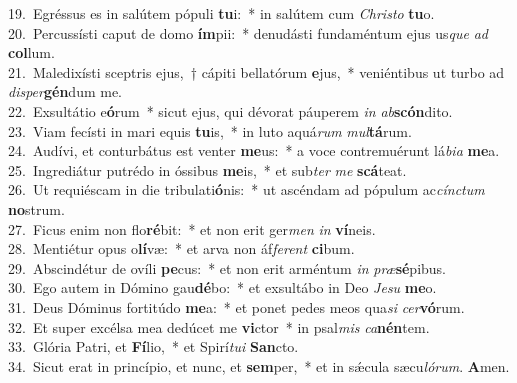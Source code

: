 {19.~}Egréssus es in salútem pópuli \textbf{tu}i:~* in salútem cum \textit{Chri}\textit{sto} \textbf{tu}o.\\
{20.~}Percussísti caput de domo \textbf{ím}pii:~* denudásti fundaméntum ejus us\textit{que} \textit{ad} \textbf{col}lum.\\
{21.~}Maledixísti sceptris ejus,~† cápiti bellatórum \textbf{e}jus,~* veniéntibus ut turbo ad \textit{di}\textit{sper}\textbf{gén}dum me.\\
{22.~}Exsultátio e\textbf{ó}rum~* sicut ejus, qui dévorat páuperem \textit{in} \textit{ab}\textbf{scón}dito.\\
{23.~}Viam fecísti in mari equis \textbf{tu}is,~* in luto aquá\textit{rum} \textit{mul}\textbf{tá}rum.\\
{24.~}Audívi, et conturbátus est venter \textbf{me}us:~* a voce contremuérunt lá\textit{bi}\textit{a} \textbf{me}a.\\
{25.~}Ingrediátur putrédo in óssibus \textbf{me}is,~* et sub\textit{ter} \textit{me} \textbf{scá}teat.\\
{26.~}Ut requiéscam in die tribulati\textbf{ó}nis:~* ut ascéndam ad pópulum ac\textit{cín}\textit{ctum} \textbf{no}strum.\\
{27.~}Ficus enim non flo\textbf{ré}bit:~* et non erit ger\textit{men} \textit{in} \textbf{ví}neis.\\
{28.~}Mentiétur opus o\textbf{lí}væ:~* et arva non áf\textit{fe}\textit{rent} \textbf{ci}bum.\\
{29.~}Abscindétur de ovíli \textbf{pe}cus:~* et non erit arméntum \textit{in} \textit{præ}\textbf{sé}pibus.\\
{30.~}Ego autem in Dómino gau\textbf{dé}bo:~* et exsultábo in Deo \textit{Je}\textit{su} \textbf{me}o.\\
{31.~}Deus Dóminus fortitúdo \textbf{me}a:~* et ponet pedes meos qua\textit{si} \textit{cer}\textbf{vó}rum.\\
{32.~}Et super excélsa mea dedúcet me \textbf{vi}ctor~* in psal\textit{mis} \textit{ca}\textbf{nén}tem.\\
{33.~}Glória Patri, et \textbf{Fí}lio,~* et Spirí\textit{tu}\textit{i} \textbf{San}cto.\\
{34.~}Sicut erat in princípio, et nunc, et \textbf{sem}per,~* et in sǽcula sæcu\textit{ló}\textit{rum}. \textbf{A}men.\\
